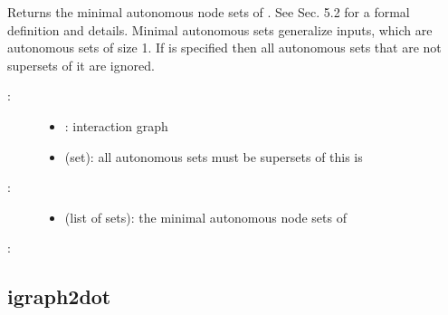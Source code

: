 \documentclass[letterpaper,10pt,english]{sphinxmanual}
\begin{document}
\begin{fulllineitems}
\label{\detokenize{InteractionGraphs:PyBoolNet.InteractionGraphs.find_minimal_autonomous_nodes}}
Returns the minimal autonomous node sets of .
See {\hyperref[\detokenize{Bibliography:klarner2015approx}]{}} Sec. 5.2 for a formal definition and details.
Minimal autonomous sets generalize inputs, which are autonomous sets of size 1.
If  is specified then all autonomous sets that are not supersets of it are ignored.
\begin{description}
\item[{:}] \leavevmode\begin{itemize}
\item {} 
: interaction graph

\item {} 
 (set): all autonomous sets must be supersets of this is

\end{itemize}

\item[{:}] \leavevmode\begin{itemize}
\item {} 
 (list of sets): the minimal autonomous node sets of 

\end{itemize}

\end{description}

:

\begin{sphinxVerbatim}[commandchars=\\\{\}]
\end{sphinxVerbatim}

\end{fulllineitems}



\subsection{igraph2dot}
\label{\detokenize{InteractionGraphs:id5}}\label{\detokenize{InteractionGraphs:igraph2dot}}
\end{document}
